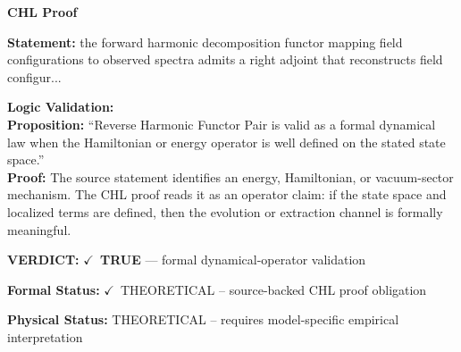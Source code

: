 \vspace{0.45em}
\noindent\textbf{CHL Proof}\par
\textbf{Statement:} the forward harmonic decomposition functor mapping field configurations to observed
spectra admits a right adjoint that reconstructs field configur...

\textbf{Logic Validation:}\\
\textbf{Proposition:} ``Reverse Harmonic Functor Pair is valid as a formal dynamical law when the Hamiltonian or
energy operator is well defined on the stated state space.''\\
\textbf{Proof:} The source statement identifies an energy, Hamiltonian, or vacuum-sector mechanism. The
CHL proof reads it as an operator claim: if the state space and localized terms are
defined, then the evolution or extraction channel is formally meaningful.

\textbf{VERDICT:} \ensuremath{\checkmark}\ \textbf{TRUE} --- formal dynamical-operator validation

\textbf{Formal Status:} \ensuremath{\checkmark}\ THEORETICAL -- source-backed CHL proof obligation

\textbf{Physical Status:} THEORETICAL -- requires model-specific empirical interpretation
\par\vspace{0.45em}
\par
\ifTZPDarkEdition
{}
\fi
\endgroup
\endgroup
